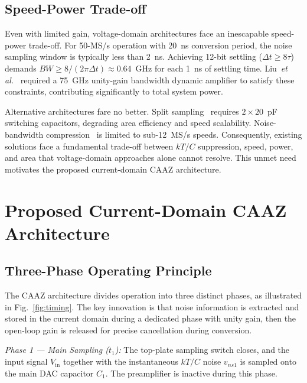 \documentclass[journal]{IEEEtran}
\begin{document}
\subsection{Speed-Power Trade-off}

Even with limited gain, voltage-domain architectures face an inescapable speed-power trade-off. For 50-MS/s operation with 20~ns conversion period, the noise sampling window is typically less than 2~ns. Achieving 12-bit settling ($\Delta t \geq 8\tau$) demands $BW \geq 8/(2\pi\Delta t) \approx 0.64$~GHz for each 1~ns of settling time. Liu~\textit{et al.}~\cite{liu202013bit} required a 75~GHz unity-gain bandwidth dynamic amplifier to satisfy these constraints, contributing significantly to total system power.

Alternative architectures fare no better. Split sampling~\cite{huang2025split} requires $2\times 20$~pF switching capacitors, degrading area efficiency and speed scalability. Noise-bandwidth compression~\cite{li2020_SAR} is limited to sub-12~MS/s speeds. Consequently, existing solutions face a fundamental trade-off between $kT/C$ suppression, speed, power, and area that voltage-domain approaches alone cannot resolve. This unmet need motivates the proposed current-domain CAAZ architecture.

\section{Proposed Current-Domain CAAZ Architecture}
\label{sec:caaz}

\subsection{Three-Phase Operating Principle}

The CAAZ architecture divides operation into three distinct phases, as illustrated in Fig.~\ref{fig:timing}. The key innovation is that noise information is extracted and stored in the current domain during a dedicated phase with unity gain, then the open-loop gain is released for precise cancellation during conversion.

\textit{Phase 1 --- Main Sampling ($t_1$):} The top-plate sampling switch closes, and the input signal $V_{\text{in}}$ together with the instantaneous $kT/C$ noise $v_{ns1}$ is sampled onto the main DAC capacitor $C_1$. The preamplifier is inactive during this phase.
\end{document}
